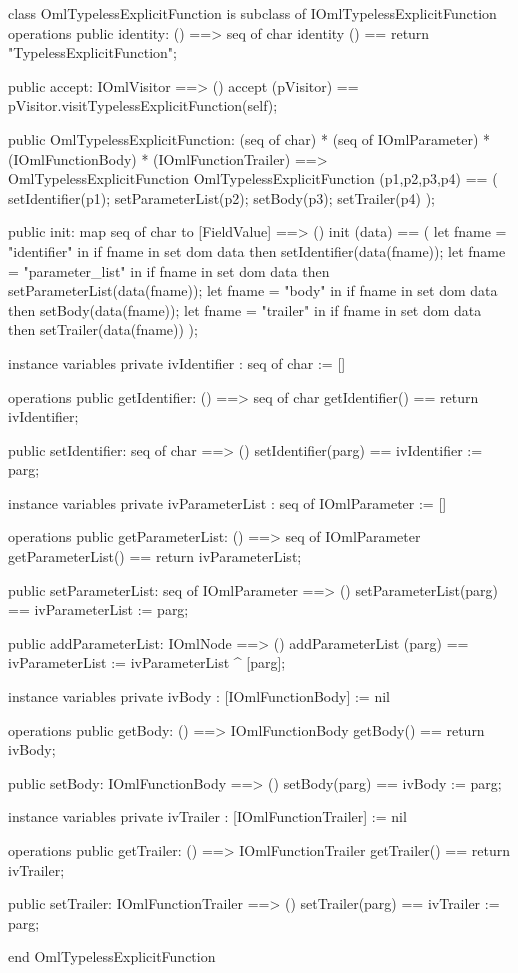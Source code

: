 \begin{vdm_al}
class OmlTypelessExplicitFunction is subclass of IOmlTypelessExplicitFunction
operations
  public identity: () ==> seq of char
  identity () == return "TypelessExplicitFunction";

  public accept: IOmlVisitor ==> ()
  accept (pVisitor) == pVisitor.visitTypelessExplicitFunction(self);

  public OmlTypelessExplicitFunction:
      (seq of char) *
      (seq of IOmlParameter) *
      (IOmlFunctionBody) *
      (IOmlFunctionTrailer) ==> OmlTypelessExplicitFunction
  OmlTypelessExplicitFunction (p1,p2,p3,p4) == 
   ( setIdentifier(p1);
     setParameterList(p2);
     setBody(p3);
     setTrailer(p4) );

  public init: map seq of char to [FieldValue] ==> ()
  init (data) ==
    ( let fname = "identifier" in
        if fname in set dom data
        then setIdentifier(data(fname));
      let fname = "parameter_list" in
        if fname in set dom data
        then setParameterList(data(fname));
      let fname = "body" in
        if fname in set dom data
        then setBody(data(fname));
      let fname = "trailer" in
        if fname in set dom data
        then setTrailer(data(fname)) );

instance variables
  private ivIdentifier : seq of char := []

operations
  public getIdentifier: () ==> seq of char
  getIdentifier() == return ivIdentifier;

  public setIdentifier: seq of char ==> ()
  setIdentifier(parg) == ivIdentifier := parg;

instance variables
  private ivParameterList : seq of IOmlParameter := []

operations
  public getParameterList: () ==> seq of IOmlParameter
  getParameterList() == return ivParameterList;

  public setParameterList: seq of IOmlParameter ==> ()
  setParameterList(parg) == ivParameterList := parg;

  public addParameterList: IOmlNode ==> ()
  addParameterList (parg) == ivParameterList := ivParameterList ^ [parg];

instance variables
  private ivBody : [IOmlFunctionBody] := nil

operations
  public getBody: () ==> IOmlFunctionBody
  getBody() == return ivBody;

  public setBody: IOmlFunctionBody ==> ()
  setBody(parg) == ivBody := parg;

instance variables
  private ivTrailer : [IOmlFunctionTrailer] := nil

operations
  public getTrailer: () ==> IOmlFunctionTrailer
  getTrailer() == return ivTrailer;

  public setTrailer: IOmlFunctionTrailer ==> ()
  setTrailer(parg) == ivTrailer := parg;

end OmlTypelessExplicitFunction
\end{vdm_al}

